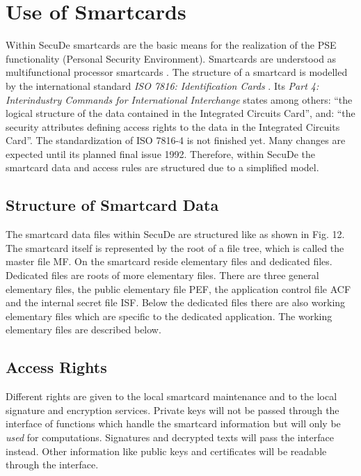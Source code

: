 \section{Use of Smartcards}
\thispagestyle{myheadings}
\label{sc}

Within SecuDe smartcards are the basic means for the realization
of the PSE functionality (Personal Security Environment).
Smartcards are understood
as multifunctional processor smartcards \cite{str1}.
The structure of a smartcard is modelled by the international
standard {\em ISO 7816:
Identification Cards} \cite{iso3}. Its {\em Part 4:
Interindustry Commands for International Interchange}
states among others:
``the logical structure of the data contained in the
Integrated Circuits Card'', and: ``the security attributes
defining access rights to the data in the Integrated Circuits Card''.
The standardization of ISO 7816-4 is not finished yet.
Many changes are expected until its planned final issue 1992.
Therefore, within SecuDe
the smartcard data and access rules
are structured due to a simplified model.

\subsection{Structure of Smartcard Data}
\label{sc-struct}
The smartcard data files within SecuDe
are structured like as shown in Fig. 12.
\\[1ex]

The smartcard itself is represented by the root of a file tree,
which is called the master file MF.
On the smartcard reside elementary files and dedicated files.
Dedicated files are roots of more elementary files.
There are three general elementary files, the public elementary file PEF,
the application control file ACF and the internal secret file ISF.
Below the dedicated files there are also working elementary files
which are specific to the dedicated application.
The working elementary files are described below.

\subsection{Access Rights}
\label{sc-ar}

Different rights are given to the local smartcard maintenance
and to the local signature and encryption services.
Private keys will not be passed through the interface
of functions which handle the smartcard information but will
only be {\em used} for computations. Signatures and decrypted
texts will pass the interface instead.
Other information like public keys and certificates will
be readable through the interface.

